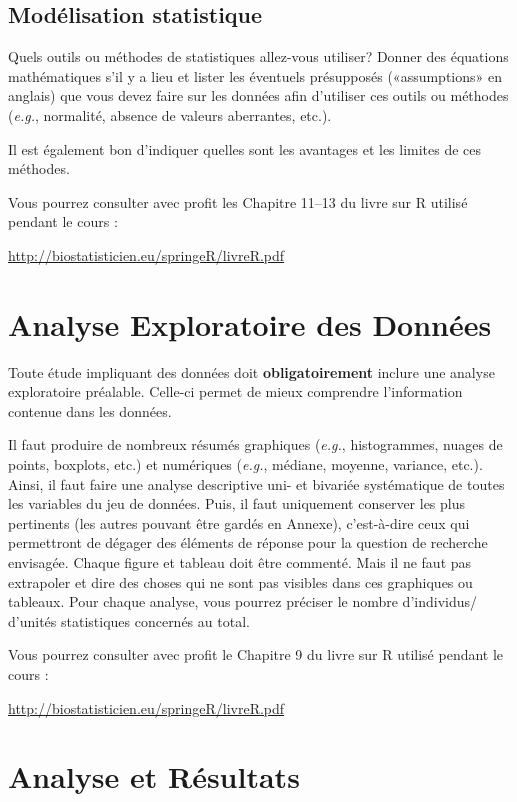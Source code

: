 \documentclass[mstat,12pt]{unswthesis}
\begin{document}
\section{Modélisation statistique}\label{moduxe9lisation-statistique}

Quels outils ou méthodes de statistiques allez-vous utiliser? Donner des
équations mathématiques s'il y a lieu et lister les éventuels
présupposés («assumptions» en anglais) que vous devez faire sur les
données afin d'utiliser ces outils ou méthodes (\emph{e.g.}, normalité,
absence de valeurs aberrantes, etc.).

Il est également bon d'indiquer quelles sont les avantages et les
limites de ces méthodes.

Vous pourrez consulter avec profit les Chapitre 11--13 du livre sur R
utilisé pendant le cours :

\url{http://biostatisticien.eu/springeR/livreR.pdf}

\chapter{Analyse Exploratoire des
Données}\label{analyse-exploratoire-des-donnuxe9es}

Toute étude impliquant des données doit \textbf{obligatoirement} inclure
une analyse exploratoire préalable. Celle-ci permet de mieux comprendre
l'information contenue dans les données.

Il faut produire de nombreux résumés graphiques (\emph{e.g.},
histogrammes, nuages de points, boxplots, etc.) et numériques
(\emph{e.g.}, médiane, moyenne, variance, etc.). Ainsi, il faut faire
une analyse descriptive uni- et bivariée systématique de toutes les
variables du jeu de données. Puis, il faut uniquement conserver les plus
pertinents (les autres pouvant être gardés en Annexe), c'est-à-dire ceux
qui permettront de dégager des éléments de réponse pour la question de
recherche envisagée. Chaque figure et tableau doit être commenté. Mais
il ne faut pas extrapoler et dire des choses qui ne sont pas visibles
dans ces graphiques ou tableaux. Pour chaque analyse, vous pourrez
préciser le nombre d'individus/ d'unités statistiques concernés au
total.

Vous pourrez consulter avec profit le Chapitre 9 du livre sur R utilisé
pendant le cours :

\url{http://biostatisticien.eu/springeR/livreR.pdf}

\chapter{Analyse et Résultats}\label{analyse-et-ruxe9sultats}
\end{document}
